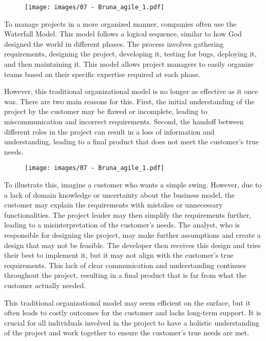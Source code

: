 \begin{figure}[!h]
  \centering
  \texttt{[image: images/07 - Bruna\_agile\_1.pdf]}
\end{figure}

To manage projects in a more organized manner, companies often use the
Waterfall Model. This model follows a logical sequence, similar to how
God designed the world in different phases. The process involves
gathering requirements, designing the project, developing it, testing
for bugs, deploying it, and then maintaining it. This model allows
project managers to easily organize teams based on their specific
expertise required at each phase.

However, this traditional organizational model is no longer as effective
as it once was. There are two main reasons for this. First, the initial
understanding of the project by the customer may be flawed or
incomplete, leading to miscommunication and incorrect requirements.
Second, the handoff between different roles in the project can result in
a loss of information and understanding, leading to a final product that
does not meet the customer's true needs.

\begin{figure}[!h]
  \centering
  \texttt{[image: images/07 - Bruna\_agile\_1.pdf]}
\end{figure}

To illustrate this, imagine a customer who wants a simple swing.
However, due to a lack of domain knowledge or uncertainty about the
business model, the customer may explain the requirements with mistakes
or unnecessary functionalities. The project leader may then simplify the
requirements further, leading to a misinterpretation of the customer's
needs. The analyst, who is responsible for designing the project, may
make further assumptions and create a design that may not be feasible.
The developer then receives this design and tries their best to
implement it, but it may not align with the customer's true
requirements. This lack of clear communication and understanding
continues throughout the project, resulting in a final product that is
far from what the customer actually needed.

This traditional organizational model may seem efficient on the surface,
but it often leads to costly outcomes for the customer and lacks
long-term support. It is crucial for all individuals involved in the
project to have a holistic understanding of the project and work
together to ensure the customer's true needs are met.


